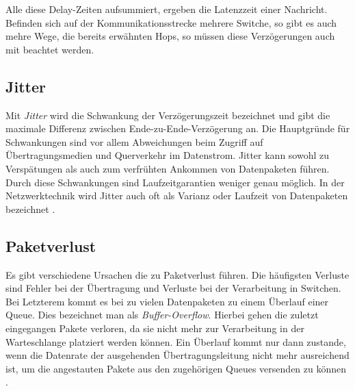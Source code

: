 Alle diese Delay-Zeiten aufsummiert, ergeben die Latenzzeit einer Nachricht. Befinden sich auf der Kommunikationsstrecke mehrere Switche, so gibt es auch mehre Wege, die bereits erwähnten Hops, so müssen diese Verzögerungen auch mit beachtet werden.

\subsection{Jitter}\label{sec:Jitter}
Mit \emph{Jitter} wird die Schwankung der Verzögerungszeit bezeichnet und gibt die maximale Differenz zwischen Ende-zu-Ende-Verzögerung an. Die Hauptgründe für Schwankungen sind vor allem Abweichungen beim Zugriff auf Übertragungsmedien und Querverkehr im Datenstrom. Jitter kann sowohl zu Verspätungen als auch zum verfrühten Ankommen von Datenpaketen führen. Durch diese Schwankungen sind Laufzeitgarantien weniger genau möglich. In der Netzwerktechnik wird Jitter auch oft als Varianz oder Laufzeit von Datenpaketen bezeichnet \cite{GrundlagenNetwork} \cite{ComputerNetworking}.

 \subsection{Paketverlust}
Es gibt verschiedene Ursachen die zu Paketverlust führen. Die häufigsten Verluste sind Fehler bei der Übertragung und Verluste bei der Verarbeitung in Switchen. Bei Letzterem kommt es bei zu vielen Datenpaketen zu einem Überlauf einer Queue. Dies bezeichnet man als \emph{Buffer-Overflow}. Hierbei gehen die zuletzt eingegangen Pakete verloren, da sie nicht mehr zur Verarbeitung in der Warteschlange platziert werden können. Ein Überlauf kommt nur dann zustande, wenn die Datenrate der ausgehenden Übertragungsleitung nicht mehr ausreichend ist, um die angestauten Pakete aus den zugehörigen Queues versenden zu können \cite{GrundlagenNetwork}\cite{ComputerNetworking}.